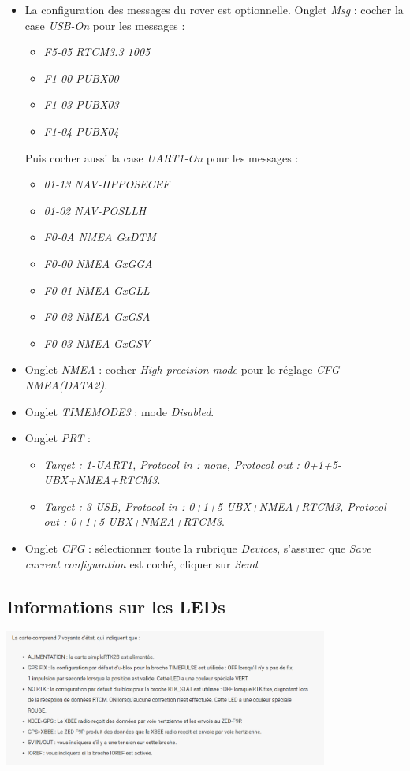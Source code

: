 \documentclass[12pt]{report}
\begin{document}
\begin{itemize}
    \item La configuration des messages du rover est optionnelle. Onglet \textit{Msg} : cocher la case \textit{USB-On} pour les messages : 
    \begin{itemize}
        \item \textit{F5-05 RTCM3.3 1005}
        \item \textit{F1-00 PUBX00}
        \item \textit{F1-03 PUBX03}
        \item \textit{F1-04 PUBX04}
    \end{itemize}
    Puis cocher aussi la case \textit{UART1-On} pour les messages :
    \begin{itemize}
        \item \textit{01-13 NAV-HPPOSECEF}
        \item \textit{01-02 NAV-POSLLH}
        \item \textit{F0-0A NMEA GxDTM}
        \item \textit{F0-00 NMEA GxGGA}
        \item \textit{F0-01 NMEA GxGLL}
        \item \textit{F0-02 NMEA GxGSA}
        \item \textit{F0-03 NMEA GxGSV}
    \end{itemize}
    \item Onglet \textit{NMEA} : cocher \textit{High precision mode} pour le réglage \textit{CFG-NMEA(DATA2)}.
    \item Onglet \textit{TIMEMODE3} : mode \textit{Disabled}.
    \item Onglet \textit{PRT} : 
    \begin{itemize}
        \item \textit{Target : 1-UART1, Protocol in : none, Protocol out : 0+1+5-UBX+NMEA+RTCM3}.
        \item \textit{Target : 3-USB, Protocol in : 0+1+5-UBX+NMEA+RTCM3, Protocol out : 0+1+5-UBX+NMEA+RTCM3}.
    \end{itemize}
    \item Onglet \textit{CFG} : sélectionner toute la rubrique \textit{Devices}, s'assurer que \textit{Save current configuration} est coché, cliquer sur \textit{Send}.
\end{itemize}

\subsection{Informations sur les LEDs}
\begin{center}
    \includegraphics[width=0.8\textwidth]{imgs/led.png}
\end{center}
\end{document}
